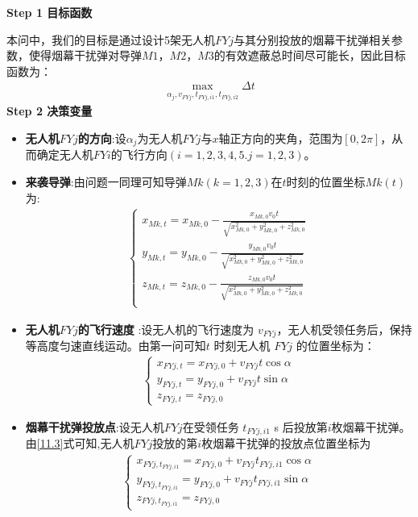 \documentclass[../main.tex]{subfiles}
\begin{document}
\noindent \textbf{Step 1 目标函数}
\par 本问中，我们的目标是通过设计5架无人机$FYj$与其分别投放的烟幕干扰弹相关参数，使得烟幕干扰弹对导弹$M1$，$M2$，$M3$的有效遮蔽总时间尽可能长，因此目标函数为：
\begin{align}\label{11.1}
  \underset{\alpha _j,v_{FYj},t_{FYj,i1},t_{FYj,i2}}{\max}\Delta t
\end{align}
\noindent \textbf{Step 2 决策变量}

\begin{itemize}
\item \textbf{无人机$FYj$的方向}:设$\alpha_j$为无人机$FYj$与$x$轴正方向的夹角，范围为$\left[ 0,2\pi \right] $，从而确定无人机$FYi$的飞行方向$(i=1,2,3,4,5.j=1,2,3)$。

\item \textbf{来袭导弹}:由问题一同理可知导弹$Mk(k=1,2,3)$在$t$时刻的位置坐标$Mk\left( t \right)$为:
\begin{align}
	\left\{ \begin{array}{l}
	x_{Mk,t}=x_{Mk,0}-\frac{x_{Mk,0}v_0t}{\sqrt{x_{Mk,0}^{2}+y_{Mk,0}^{2}+z_{Mk,0}^{2}}}\\
	y_{Mk,t}=y_{Mk,0}-\frac{y_{Mk,0}v_0t}{\sqrt{x_{Mk,0}^{2}+y_{Mk,0}^{2}+z_{Mk,0}^{2}}}\\
	z_{Mk,t}=z_{Mk,0}-\frac{z_{Mk,0}v_0t}{\sqrt{x_{Mk,0}^{2}+y_{Mk,0}^{2}+z_{Mk,0}^{2}}}\\
\end{array} \right. 
\end{align}
\item  \textbf{无人机$FYj$的飞行速度} :设无人机的飞行速度为 \( v_{FYj} \)，无人机受领任务后，保持等高度匀速直线运动。由第一问可知\( t \) 时刻无人机 \( FYj \) 的位置坐标为：
\begin{align}\label{11.3}
\begin{cases}
x_{FYj,t} = x_{FYj,0} + v_{FYj} t \cos\alpha \\
y_{FYj,t} = y_{FYj,0} + v_{FYj} t \sin\alpha \\
z_{FYj,t} = z_{FYj,0}
\end{cases}
\end{align}
\item \textbf{烟幕干扰弹投放点}:设无人机$FYj$在受领任务 \( t_{FYj,i1} \) s 后投放第$i$枚烟幕干扰弹。 由\eqref{11.3}式可知,无人机$FYj$投放的第$i$枚烟幕干扰弹的投放点位置坐标为
\begin{align}
\begin{cases}
x_{FYj,t_{FYj,i1}} = x_{FYj,0} + v_{FYj} t_{FYj,i1} \cos\alpha \\
y_{FYj,t_{FYj,i1}} = y_{FYj,0} + v_{FYj} t_{FYj,i1} \sin\alpha \\
z_{FYj,t_{FYj,i1}} = z_{FYj,0}
\end{cases}
\end{align}


\end{itemize}
\end{document}

